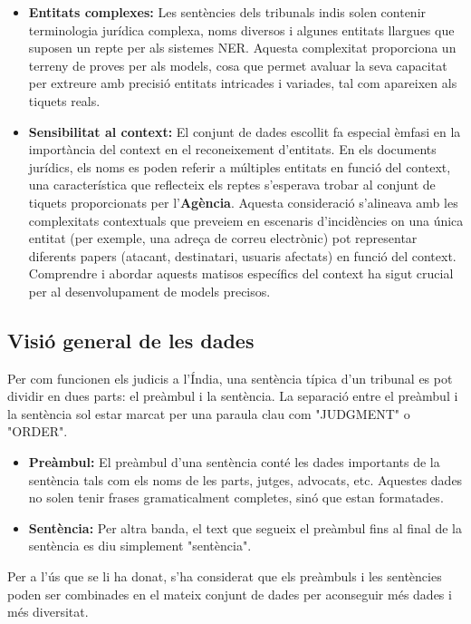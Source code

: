 \begin{itemize}
  \item \textbf{Entitats complexes:} Les sentències dels tribunals indis solen contenir terminologia jurídica complexa, noms diversos i algunes entitats llargues que suposen un repte per als sistemes NER. Aquesta complexitat proporciona un terreny de proves per als models, cosa que permet avaluar la seva capacitat per extreure amb precisió entitats intricades i variades, tal com apareixen als tiquets reals.
  \item \textbf{Sensibilitat al context:} El conjunt de dades escollit fa especial èmfasi en la importància del context en el reconeixement d'entitats. En els documents jurídics, els noms es poden referir a múltiples entitats en funció del context, una característica que reflecteix els reptes s'esperava trobar al conjunt de tiquets proporcionats per l'\textbf{Agència}. Aquesta consideració s'alineava amb les complexitats contextuals que preveiem en escenaris d'incidències on una única entitat (per exemple, una adreça de correu electrònic) pot representar diferents papers (atacant, destinatari, usuaris afectats) en funció del context. Comprendre i abordar aquests matisos específics del context ha sigut crucial per al desenvolupament de models precisos.
\end{itemize}


\subsection{Visió general de les dades}
Per com funcionen els judicis a l'Índia, una sentència típica d'un tribunal es pot dividir en dues parts: el preàmbul i la sentència. La separació entre el preàmbul i la sentència sol estar marcat per una paraula clau com "JUDGMENT" o "ORDER". 
\begin{itemize}
  \item \textbf{Preàmbul:} El preàmbul d'una sentència conté les dades importants de la sentència tals com els noms de les parts, jutges, advocats, etc. Aquestes dades no solen tenir frases gramaticalment completes, sinó que estan formatades.
  \item \textbf{Sentència:} Per altra banda, el text que segueix el preàmbul fins al final de la sentència es diu simplement "sentència".
\end{itemize}
Per a l'ús que se li ha donat, s'ha considerat que els preàmbuls i les sentències poden ser combinades en el mateix conjunt de dades per aconseguir més dades i més diversitat.

